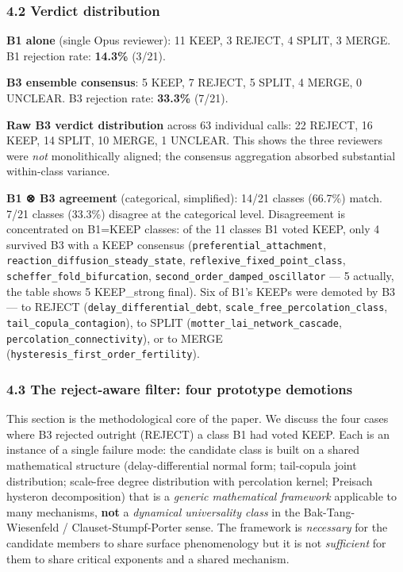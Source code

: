 \documentclass[
  letterpaper,
  11pt]{article}
\begin{document}
\subsubsection{4.2 Verdict distribution}\label{verdict-distribution}

\textbf{B1 alone} (single Opus reviewer): 11 KEEP, 3 REJECT, 4 SPLIT, 3
MERGE. B1 rejection rate: \textbf{14.3\%} (3/21).

\textbf{B3 ensemble consensus}: 5 KEEP, 7 REJECT, 5 SPLIT, 4 MERGE, 0
UNCLEAR. B3 rejection rate: \textbf{33.3\%} (7/21).

\textbf{Raw B3 verdict distribution} across 63 individual calls: 22
REJECT, 16 KEEP, 14 SPLIT, 10 MERGE, 1 UNCLEAR. This shows the three
reviewers were \emph{not} monolithically aligned; the consensus
aggregation absorbed substantial within-class variance.

\textbf{B1 ⊗ B3 agreement} (categorical, simplified): 14/21 classes
(66.7\%) match. 7/21 classes (33.3\%) disagree at the categorical level.
Disagreement is concentrated on B1=KEEP classes: of the 11 classes B1
voted KEEP, only 4 survived B3 with a KEEP consensus
(\texttt{preferential\_attachment},
\texttt{reaction\_diffusion\_steady\_state},
\texttt{reflexive\_fixed\_point\_class},
\texttt{scheffer\_fold\_bifurcation},
\texttt{second\_order\_damped\_oscillator} --- 5 actually, the table
shows 5 KEEP\_strong final). Six of B1's KEEPs were demoted by B3 --- to
REJECT (\texttt{delay\_differential\_debt},
\texttt{scale\_free\_percolation\_class},
\texttt{tail\_copula\_contagion}), to SPLIT
(\texttt{motter\_lai\_network\_cascade},
\texttt{percolation\_connectivity}), or to MERGE
(\texttt{hysteresis\_first\_order\_fertility}).

\subsubsection{4.3 The reject-aware filter: four prototype
demotions}\label{the-reject-aware-filter-four-prototype-demotions}

This section is the methodological core of the paper. We discuss the
four cases where B3 rejected outright (REJECT) a class B1 had voted
KEEP. Each is an instance of a single failure mode: the candidate class
is built on a shared mathematical structure (delay-differential normal
form; tail-copula joint distribution; scale-free degree distribution
with percolation kernel; Preisach hysteron decomposition) that is a
\emph{generic mathematical framework} applicable to many mechanisms,
\textbf{not} a \emph{dynamical universality class} in the
Bak-Tang-Wiesenfeld / Clauset-Stumpf-Porter sense. The framework is
\emph{necessary} for the candidate members to share surface
phenomenology but it is not \emph{sufficient} for them to share critical
exponents and a shared mechanism.
\end{document}
